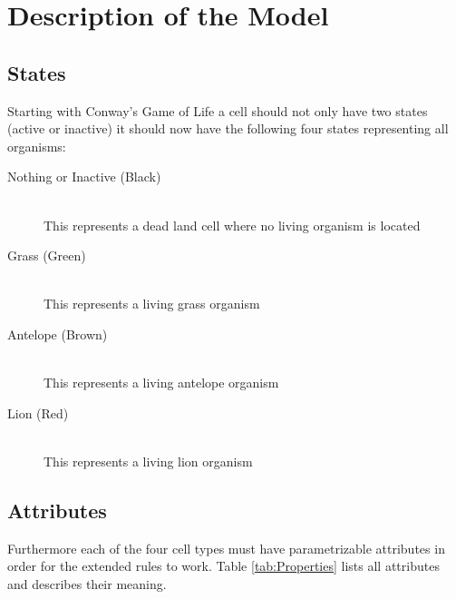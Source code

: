 \documentclass[11pt]{article}
\begin{document}
\section{Description of the Model}
\subsection{States}
Starting with Conway's Game of Life \cite{gameOfLife} a cell should not only have two states (active or inactive) it should now have the following four states representing all organisms:

\begin{description}
  \item[Nothing or Inactive (Black)] \hfill \\
	This represents a dead land cell where no living organism is located
  \item[Grass (Green)] \hfill \\
	This represents a living grass organism
  \item[Antelope (Brown)]  \hfill \\
	This represents a living antelope organism
  \item[Lion (Red)] 
   \hfill \\This represents a living lion organism
\end{description}

\subsection{Attributes}
Furthermore each of the four cell types must have parametrizable attributes in order for the extended rules to work. 
Table \ref{tab:Properties} lists all attributes and describes their meaning.
\end{document}
